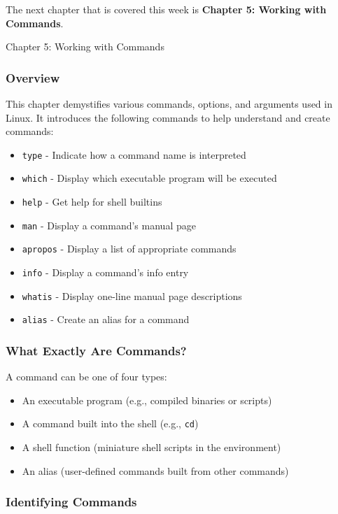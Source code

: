 The next chapter that is covered this week is \textbf{Chapter 5: Working with Commands}.

\begin{notes}{Chapter 5: Working with Commands}
    \subsubsection*{Overview}

    This chapter demystifies various commands, options, and arguments used in Linux. It introduces the following commands to help understand and create commands:
    \begin{itemize}
        \item \texttt{type} - Indicate how a command name is interpreted
        \item \texttt{which} - Display which executable program will be executed
        \item \texttt{help} - Get help for shell builtins
        \item \texttt{man} - Display a command's manual page
        \item \texttt{apropos} - Display a list of appropriate commands
        \item \texttt{info} - Display a command's info entry
        \item \texttt{whatis} - Display one-line manual page descriptions
        \item \texttt{alias} - Create an alias for a command
    \end{itemize}

    \subsubsection*{What Exactly Are Commands?}

    A command can be one of four types:
    \begin{itemize}
        \item An executable program (e.g., compiled binaries or scripts)
        \item A command built into the shell (e.g., \texttt{cd})
        \item A shell function (miniature shell scripts in the environment)
        \item An alias (user-defined commands built from other commands)
    \end{itemize}

    \subsubsection*{Identifying Commands}


\end{notes}
